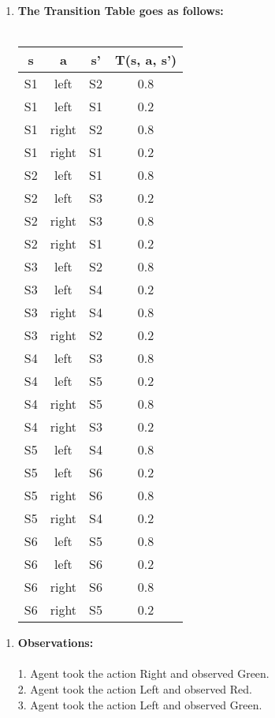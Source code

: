 \documentclass{article}
\begin{document}
\begin{enumerate}

    \item {\textbf{The Transition Table goes as follows:}}\\\\
    \begin{center}
    \begin{tabular}{ |c|c|c|c| } 
     \hline
     s & a & s' & T(s, a, s') \\ 
     \hline
     S1 & left & S2 & 0.8 \\ 
     S1 & left & S1 & 0.2 \\ 
     S1 & right & S2 & 0.8 \\ 
     S1 & right & S1 & 0.2 \\
     S2 & left & S1 & 0.8 \\ 
     S2 & left & S3 & 0.2 \\ 
     S2 & right & S3 & 0.8 \\ 
     S2 & right & S1 & 0.2 \\ 
     S3 & left & S2 & 0.8 \\ 
     S3 & left & S4 & 0.2 \\ 
     S3 & right & S4 & 0.8 \\ 
     S3 & right & S2 & 0.2 \\ 
     S4 & left & S3 & 0.8 \\ 
     S4 & left & S5 & 0.2 \\ 
     S4 & right & S5 & 0.8 \\ 
     S4 & right & S3 & 0.2 \\ 
     S5 & left & S4 & 0.8 \\ 
     S5 & left & S6 & 0.2 \\ 
     S5 & right & S6 & 0.8 \\ 
     S5 & right & S4 & 0.2 \\ 
     S6 & left & S5 & 0.8 \\ 
     S6 & left & S6 & 0.2 \\ 
     S6 & right & S6 & 0.8 \\ 
     S6 & right & S5 & 0.2 \\ 
     
     \hline
    \end{tabular}
    \end{center} 
    
\end{enumerate}

\begin{enumerate}

    \item {\textbf{Observations:}}\\\\
    1. Agent took the action Right and observed Green.\\
    2. Agent took the action Left and observed Red.\\
    3. Agent took the action Left and observed Green.

    
\end{enumerate}
\end{document}
